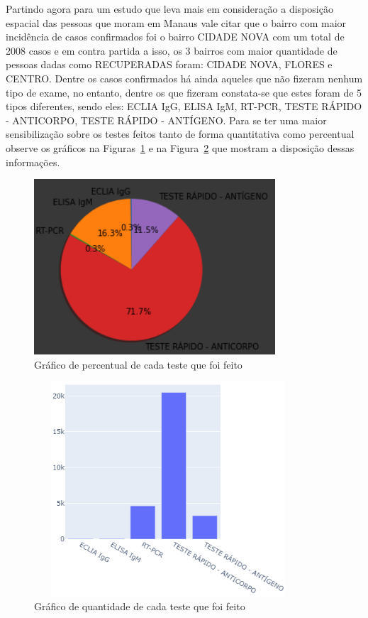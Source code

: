 Partindo agora para um estudo que leva mais em consideração a disposição espacial das pessoas que moram em Manaus vale citar que o bairro com maior incidência de casos confirmados foi o bairro CIDADE NOVA com um total de 2008 casos e em contra partida a isso, os 3 bairros com maior quantidade de pessoas dadas como RECUPERADAS foram: CIDADE NOVA, FLORES e CENTRO. Dentre os casos confirmados há ainda aqueles que não fizeram nenhum tipo de exame, no entanto, dentre os que fizeram constata-se que estes foram de 5 tipos diferentes, sendo eles: ECLIA IgG, ELISA IgM, RT-PCR, TESTE RÁPIDO - ANTICORPO, TESTE RÁPIDO - ANTÍGENO. Para se ter uma maior sensibilização sobre os testes feitos tanto de forma quantitativa como percentual observe os gráficos na Figuras~\ref{fig:uc1} e na Figura~\ref{fig:uc2} que mostram a disposição dessas informações.
\begin{figure}[!ht]
\centering
    \includegraphics[width=9cm]{img/pizzar.png}
    \caption{Gráfico de percentual de cada teste que foi feito}
    \label{fig:uc1} %
\end{figure}
\begin{figure}[!ht]
\centering
    \includegraphics[width=10cm, height=8cm]{img/barrasteste.png}
    \caption{Gráfico de quantidade de cada teste que foi feito}
    \label{fig:uc2} %
\end{figure}

